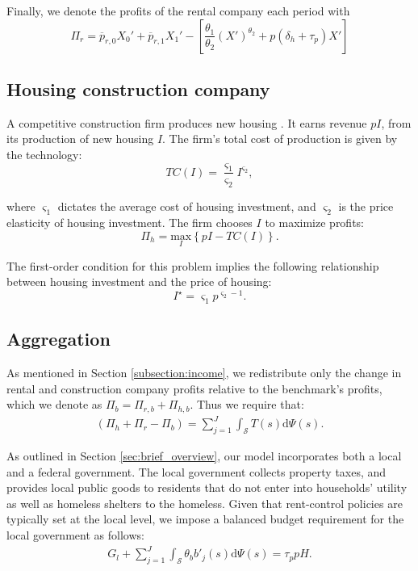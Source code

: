 \documentclass[parskip=full]{article}
\begin{document}
Finally, we denote the profits of the rental company each period with \[\Pi_r=\overline{p}_{r,0}X_0'+\overline{p}_{r,1} X_1'-\left[\frac{\theta_1}{\theta_2}(X')^{\theta_2}+p(\delta_h+\tau_p) X'\right]\]

\subsection{Housing construction company}\label{sec:construction_company}

A competitive construction firm produces new housing \citep{rotberg-2022}. It earns revenue $pI$, from its production of new housing $I$. The firm's total cost of production is given by the technology:
\begin{equation*}
TC(I)=\frac{\varsigma_{1}}{\varsigma_{2}}I^{\varsigma_{2}}\label{eq:total_cost_structure},
\end{equation*}

\noindent where $\varsigma_{1}$ dictates the average cost of housing investment, and $\varsigma_{2}$ is the price elasticity of housing investment. The firm chooses $I$ to maximize profits:
\begin{equation*}
\label{eq:construction_company_profits}
\Pi_h= \underset{I} {\text{$\mbox{max}$}}{\left\{p I-TC(I)\right\}}.
\end{equation*}

\noindent The first-order condition for this problem implies the following relationship between housing investment and the price of housing:
\begin{equation}
\label{eq:construction_company_first_order_condition}
I^{\star}=\varsigma_{1} p^{\varsigma_{2}-1}.
\end{equation}

\subsection{Aggregation}\label{subsection:aggregation}

As mentioned in Section \ref{subsection:income}, we redistribute only the change in rental and construction company profits relative to the benchmark's profits, which we denote as $\Pi_b=\Pi_{r,b}+\Pi_{h,b}$. Thus we require that:
\begin{align}\label{eq:rebates}
   (\Pi_h+\Pi_r-\Pi_b)=\sum_{j=1}^J \int_\mathcal{S} T(s)\mathrm{d}\Psi(s).
\end{align}

As outlined in Section \ref{sec:brief_overview}, our model incorporates both a local and a federal government. The local government collects property taxes, and provides local public goods to residents that do not enter into households' utility as well as homeless shelters to the homeless. Given that rent-control policies are typically set at the local level, we impose a balanced budget requirement for the local government as follows:
\begin{align}\label{eq:gbc_1}
  G_l +\sum_{j=1}^J \int_\mathcal{S} \theta_{b} b'_{j}(s)\mathrm{d}\Psi(s) = \tau_{p} p H.
\end{align}
\end{document}
